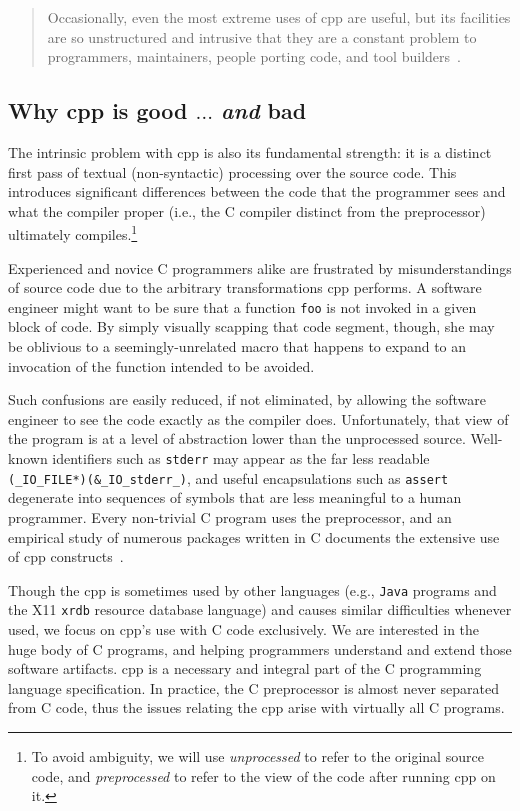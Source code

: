 \documentclass{article}
\newcommand{\Cpp}{\mbox{\textsf{cpp}}}
\newcommand{\C}{\mbox{C}}
\newcommand{\ie}{i.e.,}
\begin{document}
\begin{quotation}
\noindent Occasionally, even the most extreme uses of \Cpp{} are useful, but its
facilities are so unstructured and intrusive that they are a constant
problem to programmers, maintainers, people porting code, and tool
builders~\cite[p.~424]{Stroustrup94}.
\end{quotation}

\subsection{Why \Cpp{} is good $\ldots$ \emph{and} bad}

The intrinsic problem with \Cpp{} is also its fundamental strength: it
is a distinct first pass of textual (non-syntactic) processing over the
source code.  This introduces significant differences between the code
that the programmer sees and what the compiler proper (\ie{} the \C{}
compiler distinct from the preprocessor) ultimately
compiles.\footnote{To avoid ambiguity, we will use \emph{unprocessed} to
  refer to the original source code, and \emph{preprocessed} to refer to
  the view of the code after running \Cpp{} on it.}

Experienced and novice \C{} programmers alike are frustrated by
misunderstandings of source code due to the arbitrary transformations
\Cpp{} performs. A software engineer might want to be sure that a
function \texttt{foo} is not invoked in a given block of code.  By
simply visually scapping that code segment, though, she may be oblivious 
to a seemingly-unrelated macro that happens to expand to an invocation
of the function intended to be avoided.

Such confusions are easily reduced, if not eliminated,
by allowing the software engineer to see the code exactly as the
compiler does.  Unfortunately, that view of the program is at a level of
abstraction lower than the unprocessed source.  Well-known
identifiers such as \texttt{stderr} may appear as the far less readable
\texttt{(\_IO\_FILE*)(\&\_IO\_stderr\_)},
and useful encapsulations such as \texttt{assert} degenerate into
sequences of symbols that are less meaningful to a human programmer.  Every
non-trivial \C{} program uses the preprocessor, and an empirical study
of numerous packages written in \C{} documents the extensive use of \Cpp{}
constructs~\cite{EmpCpp-TR}.

Though the \Cpp{} is sometimes used by other languages (e.g.,
\texttt{Java} programs and the X11 \texttt{xrdb} resource database
language) and causes similar difficulties whenever used, we focus on
\Cpp{}'s use with \C{} code exclusively.  We are interested in the huge
body of \C{} programs, and helping programmers understand and extend
those software artifacts. \Cpp{} is a necessary and integral part of the
\C{} programming language specification.  In practice, the \C{}
preprocessor is almost never separated from \C{} code, thus the issues
relating the \Cpp{} arise with virtually all \C{} programs.
\end{document}
